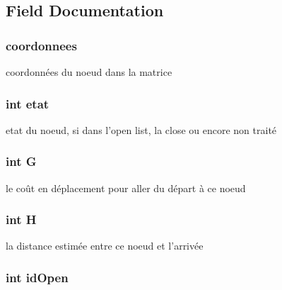 \subsection{Field Documentation}
\hypertarget{struct_noeud_a88d43117c876b9e8d3c1d94d02a82811}{
\subsubsection[{coordonnees}]{ coordonnees}}\label{struct_noeud_a88d43117c876b9e8d3c1d94d02a82811}


coordonnées du noeud dans la matrice 

\hypertarget{struct_noeud_a593430af208bfef9b3ce7325558b667b}{
\subsubsection[{etat}]{\setlength{\rightskip}{0pt plus 5cm}int etat}}\label{struct_noeud_a593430af208bfef9b3ce7325558b667b}


etat du noeud, si dans l'open list, la close ou encore non traité 

\hypertarget{struct_noeud_ab8735735273b982cc3125e51fe46e2f4}{
\subsubsection[{G}]{\setlength{\rightskip}{0pt plus 5cm}int G}}\label{struct_noeud_ab8735735273b982cc3125e51fe46e2f4}


le coût en déplacement pour aller du départ à ce noeud 

\hypertarget{struct_noeud_affa487e8e3cc48473cfc05c0ce0165e9}{
\subsubsection[{H}]{\setlength{\rightskip}{0pt plus 5cm}int H}}\label{struct_noeud_affa487e8e3cc48473cfc05c0ce0165e9}


la distance estimée entre ce noeud et l'arrivée 

\hypertarget{struct_noeud_a5b922703f4129d43c1b47bf7781c6d88}{
\subsubsection[{id\-Open}]{\setlength{\rightskip}{0pt plus 5cm}int id\-Open}}\label{struct_noeud_a5b922703f4129d43c1b47bf7781c6d88}


